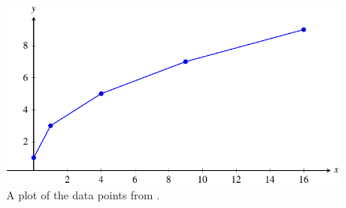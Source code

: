 \documentclass[a4paper,oneside,12pt]{article}
\begin{document}
\begin{problem}
{\begin{solution}
\begin{figure}[!htbp]
\centering
\includegraphics[scale=1]{image/06/nonlinear.pdf}
\caption{%
  A plot of the data points from .
}
\label{fig:plot_non_linear_function}
\end{figure}
\end{solution}
}{}
\end{problem}
\end{document}
